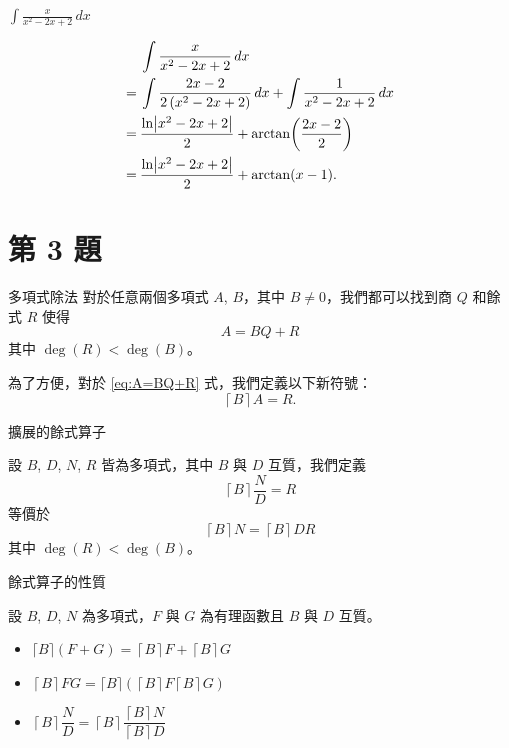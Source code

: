 \documentclass{beamer}
\newcommand{\Left} {\mathopen{}\mathclose\bgroup\left}
\newcommand{\Right}{\aftergroup\egroup\right}
\theoremstyle{remark}
\begin{document}
\begin{CJK}{UTF8}{bsmi}
\begin{frame}{$\displaystyle \int \frac{x}{x^2 - 2x + 2}\,dx$}
  \begin{solution}
    \begin{align*}
	 & \int \frac{x}{x^2 - 2x + 2}\,dx\\
      =\:& \int \frac{2x - 2}{2 \left( x^2 - 2x + 2 \right)}\,dx + \int \frac{1}{x^2 - 2x + 2}\,dx\\
      =\:& \frac{\ln \Left| x^2 - 2x + 2 \Right|}{2} + \arctan \Left( \frac{2x - 2}{2} \Right)\\
      =\:& \frac{\ln \Left| x^2 - 2x + 2 \Right|}{2} + \arctan(x-1).
    \end{align*}
  \end{solution}
\end{frame}

\section{第 3 題}
\begin{frame}{多項式除法}
  對於任意兩個多項式 $A$, $B$，其中 $B \ne 0$，我們都可以找到商 $Q$ 和餘式 $R$ 使得
  \begin{equation}
    A = BQ + R \label{eq:A=BQ+R}
  \end{equation}
  其中 $\deg(R) < \deg(B)$。
  \begin{definition}
    為了方便，對於 \eqref{eq:A=BQ+R} 式，我們定義以下新符號：
    \[\left\lceil B \right\rceil A = R.\]
  \end{definition}
\end{frame}

\begin{frame}{擴展的餘式算子}
  \begin{definition}
    設 $B$, $D$, $N$, $R$ 皆為多項式，其中 $B$ 與 $D$ 互質，我們定義
    \[\left\lceil B \right\rceil \frac N D = R\]
    等價於
    \[\left\lceil B \right\rceil N = \left\lceil B \right\rceil DR\]
    其中 $\deg(R) < \deg(B)$。
  \end{definition}
\end{frame}

\begin{frame}{餘式算子的性質}
  \begin{theorem}
    設 $B$, $D$, $N$ 為多項式，$F$ 與 $G$ 為有理函數且 $B$ 與 $D$ 互質。
    \begin{itemize}
      \item $\lceil B \rceil \left( F + G \right) = \left\lceil B \right\rceil F + \left\lceil B \right\rceil G$
      \item $\left\lceil B \right\rceil FG = \lceil B \rceil \left( \left\lceil B \right\rceil F \left\lceil B
	\right\rceil G\right)$
      \item $\left\lceil B \right\rceil \dfrac{N}{D} = \left\lceil B \right\rceil \dfrac{\left\lceil B \right\rceil
	N}{\left\lceil B \right\rceil D}$
    \end{itemize}
  \end{theorem}
\end{frame}


\end{CJK}
\end{document}
